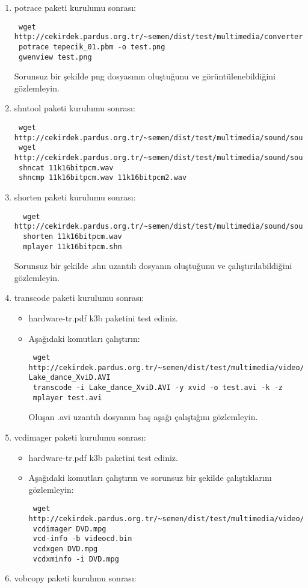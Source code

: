 \documentclass[a4paper,10pt]{article}
\begin{document}
\begin{enumerate}
\item potrace paketi kurulumu sonrası:
\begin{verbatim}
 wget http://cekirdek.pardus.org.tr/~semen/dist/test/multimedia/converter/tepecik_01.pbm 
 potrace tepecik_01.pbm -o test.png
 gwenview test.png
\end{verbatim}

Sorunsuz bir şekilde png dosyasının oluştuğunu ve görüntülenebildiğini gözlemleyin.

\item shntool paketi kurulumu sonrası:
\begin{verbatim}
 wget http://cekirdek.pardus.org.tr/~semen/dist/test/multimedia/sound/sound/sample.wav
 wget http://cekirdek.pardus.org.tr/~semen/dist/test/multimedia/sound/sound/11k16bitpcm2.wav
 shncat 11k16bitpcm.wav
 shncmp 11k16bitpcm.wav 11k16bitpcm2.wav
\end{verbatim}
\item shorten paketi kurulumu sonrası:
\begin{verbatim}
  wget http://cekirdek.pardus.org.tr/~semen/dist/test/multimedia/sound/sound/sample.wav
  shorten 11k16bitpcm.wav
  mplayer 11k16bitpcm.shn
\end{verbatim}

Sorunsuz bir şekilde .shn uzantılı dosyanın oluştuğunu ve çalıştırılabildiğini  gözlemleyin.
\item transcode paketi kurulumu sonrası:

\begin{itemize}
 \item hardware-tr.pdf k3b paketini test ediniz.
 \item Aşağıdaki komutları çalıştırın:
\begin{verbatim}
 wget http://cekirdek.pardus.org.tr/~semen/dist/test/multimedia/video/cokluortam/
Lake_dance_XviD.AVI
 transcode -i Lake_dance_XviD.AVI -y xvid -o test.avi -k -z
 mplayer test.avi
\end{verbatim}
 Oluşan .avi uzantılı dosyanın baş aşağı çalıştığını gözlemleyin.
\end{itemize}

\item vcdimager paketi kurulumu sonrası:

\begin{itemize}
 \item hardware-tr.pdf k3b paketini test ediniz.
 \item Aşağıdaki komutları çalıştırın ve sorunsuz bir şekilde çalıştıklarını gözlemleyin:
\begin{verbatim}
 wget http://cekirdek.pardus.org.tr/~semen/dist/test/multimedia/video/cokluortam/DVD.mpg
 vcdimager DVD.mpg
 vcd-info -b videocd.bin
 vcdxgen DVD.mpg
 vcdxminfo -i DVD.mpg
\end{verbatim}

\end{itemize}
\item vobcopy paketi kurulımu sonrası:

\end{enumerate}
\end{document}
